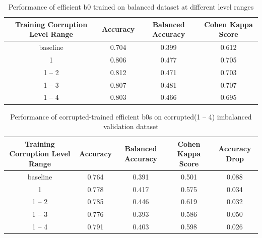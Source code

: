 \documentclass[../main.tex]{subfiles}
\begin{document}
\begin{table}[htbp]
\linespread{1.5} 
\renewcommand\arraystretch{1.25}
\centering
\begin{tabular}{|c|c|c|c|}
    \hline
     Training Corruption Level Range& Accuracy & Balanced Accuracy & Cohen Kappa Score\\
     \hline
     baseline & 0.704 & 0.399 & 0.612 \\
     \hline
     1 & 0.806 & 0.477 & 0.705   \\
     \hline
     1 -- 2& 0.812 & 0.471 & 0.703\\
     \hline
     1 -- 3& 0.807 & 0.481 & 0.707  \\
     \hline
     1 -- 4& 0.803 & 0.466 & 0.695 \\
     \hline
\end{tabular}
\caption{Performance of efficient b0 trained on balanced dataset at different level ranges}
\label{tab:corruptions_balanced}
\end{table}

\begin{table}[htbp]
\linespread{1.5} 
\renewcommand\arraystretch{1.25}
\centering
\begin{tabular}{|c|c|c|c|c|}
    \hline
     Training Corruption Level Range& Accuracy & Balanced Accuracy & Cohen Kappa Score & Accuracy Drop\\
     \hline
     baseline & 0.764 & 0.391 & 0.501& 0.088 \\
     \hline
     1 & 0.778 & 0.417 & 0.575  & 0.034 \\
     \hline
     1 -- 2& 0.785 & 0.446 & 0.619 & 0.032\\
     \hline
     1 -- 3& 0.776 & 0.393 & 0.586  & 0.050\\
     \hline
     1 -- 4& 0.791 & 0.403 & 0.598 & 0.026\\
     \hline
\end{tabular}
\caption{Performance of corrupted-trained efficient b0s on corrupted(1 -- 4) imbalanced validation dataset}
\label{tab:valid_corrupted}
\end{table}
\end{document}
